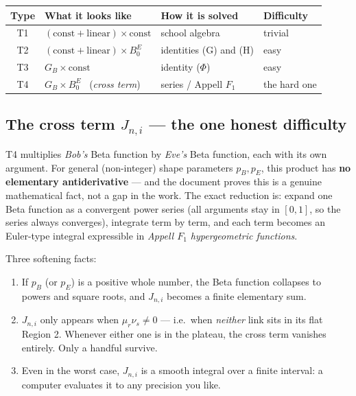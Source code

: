 \documentclass[11pt]{article}
\begin{document}
\begin{center}
\small
\begin{tabular}{clll}
\toprule
Type & What it looks like & How it is solved & Difficulty\\
\midrule
T1 & $(\text{const}+\text{linear})\times\text{const}$ & school algebra & trivial\\
T2 & $(\text{const}+\text{linear})\times B_0^{E}$ & identities (G) and (H) & easy\\
T3 & $G_B \times \text{const}$ & identity ($\Phi$) & easy\\
T4 & $G_B \times B_0^{E}$ \ (\emph{cross term}) & series / Appell $F_1$ & the hard one\\
\bottomrule
\end{tabular}
\end{center}

\subsection{The cross term $J_{n,i}$ --- the one honest difficulty}

\begin{warnbox}
T4 multiplies \emph{Bob's} Beta function by \emph{Eve's} Beta function, each with its
own argument. For general (non-integer) shape parameters $p_B, p_E$, this product has
\textbf{no elementary antiderivative} --- and the document proves this is a genuine
mathematical fact, not a gap in the work. The exact reduction is: expand one Beta
function as a convergent power series (all arguments stay in $[0,1]$, so the series
always converges), integrate term by term, and each term becomes an Euler-type
integral expressible in \emph{Appell $F_1$ hypergeometric functions}.
\end{warnbox}

Three softening facts:
\begin{enumerate}
\item If $p_B$ (or $p_E$) is a positive whole number, the Beta function collapses to
      powers and square roots, and $J_{n,i}$ becomes a finite elementary sum.
\item $J_{n,i}$ only appears when $\mu_r \nu_s \ne 0$ --- i.e.\ when \emph{neither}
      link sits in its flat Region 2. Whenever either one is in the plateau, the cross
      term vanishes entirely. Only a handful survive.
\item Even in the worst case, $J_{n,i}$ is a smooth integral over a finite interval:
      a computer evaluates it to any precision you like.
\end{enumerate}
\end{document}
